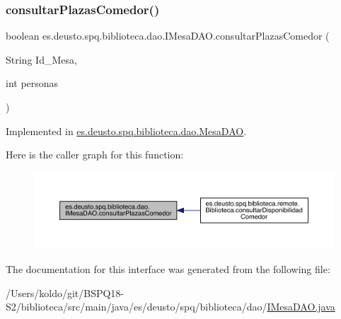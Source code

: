 \subsubsection{\texorpdfstring{consultar\+Plazas\+Comedor()}{consultarPlazasComedor()}}
{\footnotesize\ttfamily boolean es.\+deusto.\+spq.\+biblioteca.\+dao.\+I\+Mesa\+D\+A\+O.\+consultar\+Plazas\+Comedor (\begin{DoxyParamCaption}\item[{String}]{Id\+\_\+\+Mesa,  }\item[{int}]{personas }\end{DoxyParamCaption})}



Implemented in \mbox{\hyperlink{classes_1_1deusto_1_1spq_1_1biblioteca_1_1dao_1_1_mesa_d_a_o_a7631ebe9a7d3215db433ac29bb3e75c4}{es.\+deusto.\+spq.\+biblioteca.\+dao.\+Mesa\+D\+AO}}.

Here is the caller graph for this function\+:
\nopagebreak
\begin{figure}[H]
\begin{center}
\leavevmode
\includegraphics[width=350pt]{interfacees_1_1deusto_1_1spq_1_1biblioteca_1_1dao_1_1_i_mesa_d_a_o_a82ff152d68c25134fdffa41a1b08a347_icgraph}
\end{center}
\end{figure}


The documentation for this interface was generated from the following file\+:\begin{DoxyCompactItemize}
\item 
/\+Users/koldo/git/\+B\+S\+P\+Q18-\/\+S2/biblioteca/src/main/java/es/deusto/spq/biblioteca/dao/\mbox{\hyperlink{_i_mesa_d_a_o_8java}{I\+Mesa\+D\+A\+O.\+java}}\end{DoxyCompactItemize}
